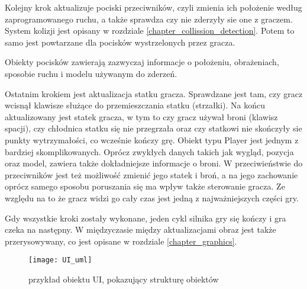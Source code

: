 Kolejny krok aktualizuje pociski przeciwników, czyli zmienia ich położenie według zaprogramowanego ruchu, a także sprawdza czy nie zderzyły sie one z graczem. System kolizji jest opisany w rozdziale \ref{chapter_collission_detection}. Potem to samo jest powtarzane dla pocisków wystrzelonych przez gracza.

Obiekty pocisków zawierają zazwyczaj informacje o położeniu, obrażeniach, sposobie ruchu i modelu używanym do zderzeń.\smallskip

Ostatnim krokiem jest aktualizacja statku gracza. Sprawdzane jest tam, czy gracz wcisnął klawisze służące do przemieszczania statku (strzałki). Na końcu aktualizowany jest statek gracza, w tym to czy gracz używał broni (klawisz spacji), czy chłodnica statku się nie przegrzała oraz czy statkowi nie skończyły sie punkty wytrzymało\'sci, co wcze\'snie kończy grę.
Obiekt typu Player jest jednym z bardziej skomplikowanych. Oprócz zwykłych danych takich jak wygląd, pozycja oraz model, zawiera także dokładniejsze informacje o broni. W przeciwieństwie do przeciwników jest też możliwo\'sć zmienić jego statek i broń, a na jego zachowanie oprócz samego sposobu poruszania się ma wpływ także sterowanie gracza. Ze względu na to że gracz widzi go cały czas jest jedną z najważniejszych czę\'sci gry.\bigskip

Gdy wszystkie kroki zostały wykonane, jeden cykl silnika gry się kończy i gra czeka na następny. W międzyczasie między aktualizacjami obraz jest także przerysowywany, co jest opisane w rozdziale \ref{chapter_graphics}.\newpage

\begin{wrapfigure}{r}{\textwidth}
	\centering
	\noindent\texttt{[image: UI\_uml]}
	\caption{przykład obiektu UI, pokazujący strukturę obiektów}
\end{wrapfigure}

\cleardoublepage